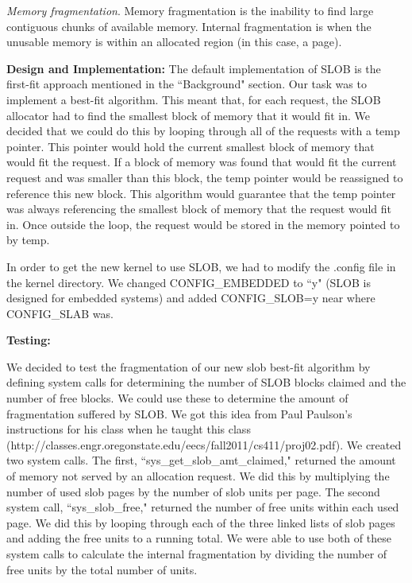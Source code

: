 \documentclass[letterpaper,10pt,titlepage]{article}
\newcommand{\tab}{\hspace*{2em}} %
\begin{document}
\begin{enumerate}
\tab\emph{Memory fragmentation}. Memory fragmentation is the inability to find large contiguous chunks of available memory. Internal fragmentation is when the unusable memory is within an allocated region (in this case, a page). \newline

\textbf{Design and Implementation:} 
The default implementation of SLOB is the first-fit approach mentioned in the ``Background" section. Our task was to implement a best-fit algorithm. This meant that, for each request, the SLOB allocator had to find the smallest block of memory that it would fit in. We decided that we could do this by looping through all of the requests with a temp pointer. This pointer would hold the current smallest block of memory that would fit the request. If a block of memory was found that would fit the current request and was smaller than this block, the temp pointer would be reassigned to reference this new block. This algorithm would guarantee that the temp pointer was always referencing the smallest block of memory that the request would fit in. Once outside the loop, the request would be stored in the memory pointed to by temp. 

\tab In order to get the new kernel to use SLOB, we had to modify the .config file in the kernel directory. We changed CONFIG\_EMBEDDED to ``y" (SLOB is designed for embedded systems) and added CONFIG\_SLOB=y near where CONFIG\_SLAB was.\newline

\textbf{Testing:} 

\tab We decided to test the fragmentation of our new slob best-fit algorithm by defining system calls for determining the number of SLOB blocks claimed and the number of free blocks. We could use these to determine the amount of fragmentation suffered by SLOB. We got this idea from Paul Paulson's instructions for his class when he taught this class (http://classes.engr.oregonstate.edu/eecs/fall2011/cs411/proj02.pdf). We created two system calls. The first, ``sys\_get\_slob\_amt\_claimed," returned the amount of memory not served by an allocation request. We did this by multiplying the number of used slob pages by the number of slob units per page. The second system call, ``sys\_slob\_free," returned the number of free units within each used page. We did this by looping through each of the three linked lists of slob pages and adding the free units to a running total. We were able to use both of these system calls to calculate the internal fragmentation by dividing the number of free units by the total number of units.


\end{enumerate}
\end{document}
